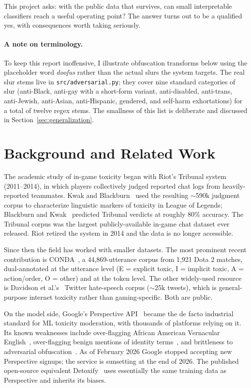 \documentclass[11pt,twocolumn,letterpaper]{article}
\begin{document}
This project asks: with the public data that survives, can small interpretable classifiers reach a useful operating point? The answer turns out to be a qualified yes, with consequences worth taking seriously.

\paragraph{A note on terminology.} To keep this report inoffensive, I illustrate obfuscation transforms below using the placeholder word \textit{doofus} rather than the actual slurs the system targets. The real slur stems live in \texttt{src/adversarial.py}; they cover nine standard categories of slur (anti-Black, anti-gay with a short-form variant, anti-disabled, anti-trans, anti-Jewish, anti-Asian, anti-Hispanic, gendered, and self-harm exhortations) for a total of twelve regex stems. The smallness of this list is deliberate and discussed in Section~\ref{sec:generalization}.

\section{Background and Related Work}

The academic study of in-game toxicity began with Riot's Tribunal system (2011--2014), in which players collectively judged reported chat logs from heavily-reported teammates. Kwak and Blackburn~\cite{kwak2014} used the resulting $\sim$590k judgment corpus to characterize linguistic markers of toxicity in League of Legends; Blackburn and Kwak~\cite{blackburn2014} predicted Tribunal verdicts at roughly 80\% accuracy. The Tribunal corpus was the largest publicly-available in-game chat dataset ever released. Riot retired the system in 2014 and the data is no longer accessible.

Since then the field has worked with smaller datasets. The most prominent recent contribution is CONDA~\cite{weld2021}, a 44{,}869-utterance corpus from 1{,}921 Dota 2 matches, dual-annotated at the utterance level (E = explicit toxic, I = implicit toxic, A = action/order, O = other) and at the token level. The other widely-used resource is Davidson et al.'s~\cite{davidson2017} Twitter hate-speech corpus ($\sim$25k tweets), which is general-purpose internet toxicity rather than gaming-specific. Both are public.

On the model side, Google's Perspective API~\cite{wulczyn2017} became the de facto industrial standard for ML toxicity moderation, with thousands of platforms relying on it. Its known weaknesses include over-flagging African American Vernacular English~\cite{sap2019}, over-flagging benign mentions of identity terms~\cite{dixon2018}, and brittleness to adversarial obfuscation~\cite{hosseini2017}. As of February 2026 Google stopped accepting new Perspective signups; the service is sunsetting at the end of 2026. The published open-source equivalent Detoxify~\cite{detoxify} uses essentially the same training data as Perspective and inherits its biases.
\end{document}
